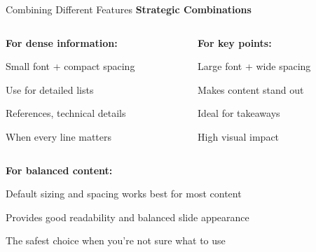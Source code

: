 \documentclass[11pt,compress,t,notes=noshow, xcolor=table]{beamer}
\begin{document}

\begin{frame}{Combining Different Features}
  \textbf{Strategic Combinations}
  
  \begin{columns}[T]
    \begin{column}{0.48\textwidth}
      \textbf{For dense information:}
      \begin{itemizeS}[small]
        \item Small font + compact spacing
        \item Use for detailed lists
        \item References, technical details
        \item When every line matters
      \end{itemizeS}
    \end{column}
    
    \begin{column}{0.48\textwidth}
      \textbf{For key points:}
      \begin{itemizeL}[large]
        \item Large font + wide spacing
        \item Makes content stand out
        \item Ideal for takeaways
        \item High visual impact
      \end{itemizeL}
    \end{column}
  \end{columns}
  
  \vspace{0.5cm}
  \textbf{For balanced content:}
  \begin{itemizeM}
    \item Default sizing and spacing works best for most content
    \item Provides good readability and balanced slide appearance
    \item The safest choice when you're not sure what to use
  \end{itemizeM}
\end{frame}

\end{document}
